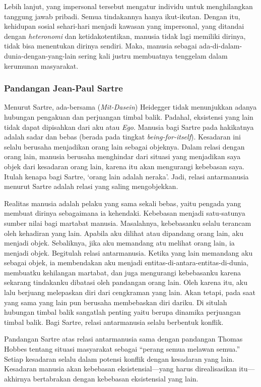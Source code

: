 \documentclass[10pt,a4paper]{article}
\begin{document}
\begin{multicols}{2}
Lebih lanjut, yang impersonal tersebut mengatur individu untuk
menghilangkan tanggung jawab pribadi. Semua tindakannya hanya
ikut-ikutan. Dengan itu, kehidupan sosial sehari-hari menjadi kawasan
yang impersonal, yang ditandai dengan \emph{heteronomi} dan
ketidakotentikan, manusia tidak lagi memiliki dirinya, tidak bisa
menentukan dirinya sendiri. Maka, manusia sebagai
ada-di-dalam-dunia-dengan-yang-lain sering kali justru membuatnya
tenggelam dalam kerumunan masyarakat.

\hypertarget{pandangan-jean-paul-sartre}{%
\subsubsection{Pandangan Jean-Paul
Sartre}\label{pandangan-jean-paul-sartre}}

Menurut Sartre, ada-bersama (\emph{Mit-Dasein}) Heidegger tidak
menunjukkan adanya hubungan pengakuan dan perjuangan timbal balik.
Padahal, eksistensi yang lain tidak dapat dipisahkan dari aku atau
\emph{Ego}. Manusia bagi Sartre pada hakikatnya adalah sadar dan bebas
(berada pada tingkat \emph{being-for-itself}). Kesadaran ini selalu
berusaha menjadikan orang lain sebagai objeknya. Dalam relasi dengan
orang lain, manusia berusaha menghindar dari situasi yang menjadikan
saya objek dari kesadaran orang lain, karena itu akan mengurangi
kebebasan saya. Itulah kenapa bagi Sartre, `orang lain adalah neraka'.
Jadi, relasi antarmanusia menurut Sartre adalah relasi yang saling
mengobjekkan.

Realitas manusia adalah pelaku yang sama sekali bebas, yaitu pengada
yang membuat dirinya sebagaimana ia kehendaki. Kebebasan menjadi
satu-satunya sumber nilai bagi martabat manusia. Masalahnya, kebebasanku
selalu terancam oleh kehadiran yang lain. Apabila aku dilihat atau
dipandang orang lain, aku menjadi objek. Sebaliknya, jika aku memandang
atu melihat orang lain, ia menjadi objek. Begitulah relasi antarmanusia.
Ketika yang lain memandang aku sebagai objek, ia membendakan aku menjadi
entitas-di-antara-entitas-di-dunia, membuatku kehilangan martabat, dan
juga mengurangi kebebasanku karena sekarang tindakanku dibatasi oleh
pandangan orang lain. Oleh karena itu, aku lalu berjuang melepaskan diri
dari cengkraman yang lain. Akan tetapi, pada saat yang sama yang lain
pun berusaha membebaskan diri dariku. Di situlah hubungan timbal balik
sangatlah penting yaitu berupa dinamika perjuangan timbal balik. Bagi
Sartre, relasi antarmanusia selalu berbentuk konflik.

Pandangan Sartre atas relasi antarmanusia sama dengan pandangan Thomas
Hobbes tentang situasi masyarakat sebagai ``perang semua melawan
semua.'' Setiap kesadaran selalu dalam potensi konflik dengan kesadaran
yang lain. Kesadaran manusia akan kebebasan eksistensial---yang harus
direalisasikan itu---akhirnya bertabrakan dengan kebebasan eksistensial
yang lain.


\end{multicols}
\end{document}

